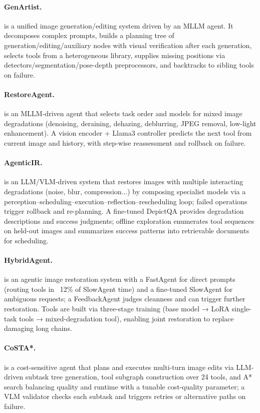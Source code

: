 \paragraph{GenArtist.}
 is a unified image generation/editing system driven by an MLLM agent. It decomposes complex prompts, builds a planning tree of generation/editing/auxiliary nodes with visual verification after each generation, selects tools from a heterogeneous library, supplies missing positions via detectors/segmentation/pose-depth preprocessors, and backtracks to sibling tools on failure.~\cite{wang2024genartist}

\paragraph{RestoreAgent.}
 is an MLLM-driven agent that selects task order and models for mixed image degradations (denoising, deraining, dehazing, deblurring, JPEG removal, low-light enhancement). A vision encoder + Llama3 controller predicts the next tool from current image and history, with step-wise reassessment and rollback on failure. ~\cite{avg240718035}

\paragraph{AgenticIR.}
 is an LLM/VLM-driven system that restores images with multiple interacting degradations (noise, blur, compression...) by composing specialist models via a perception–scheduling–execution–reflection–rescheduling loop; failed operations trigger rollback and re-planning. A fine-tuned DepictQA provides degradation descriptions and success judgments; offline exploration enumerates tool sequences on held-out images and summarizes success patterns into retrievable documents for scheduling.~\cite{avg241017809}

\paragraph{HybridAgent.}
 is an agentic image restoration system with a FastAgent for direct prompts (routing tools in ~12\% of SlowAgent time) and a fine-tuned SlowAgent for ambiguous requests; a FeedbackAgent judges cleanness and can trigger further restoration. Tools are built via three-stage training (base model → LoRA single-task tools → mixed-degradation tool), enabling joint restoration to replace damaging long chains.~\cite{avg250310120}

\paragraph{CoSTA*.}
 is a cost-sensitive agent that plans and executes multi-turn image edits via LLM-driven subtask tree generation, tool subgraph construction over 24 tools, and A* search balancing quality and runtime with a tunable cost-quality parameter; a VLM validator checks each subtask and triggers retries or alternative paths on failure. ~\cite{gupta2025costa}

